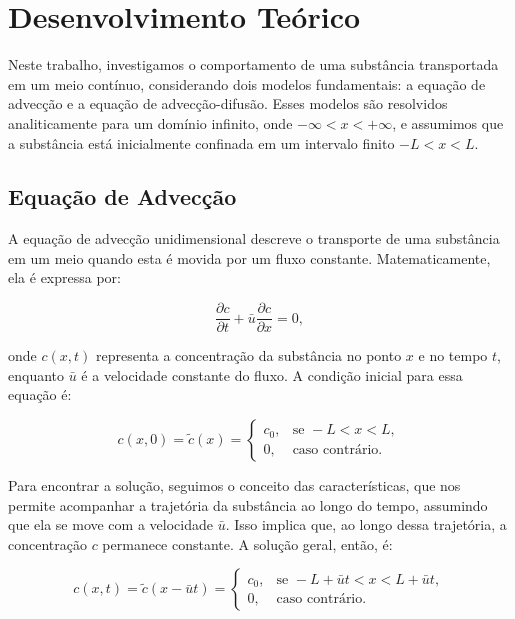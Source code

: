 \section{Desenvolvimento Teórico}

Neste trabalho, investigamos o comportamento de uma substância transportada em um meio contínuo, considerando dois modelos fundamentais: a equação de advecção e a equação de advecção-difusão. Esses modelos são resolvidos analiticamente para um domínio infinito, onde \( -\infty < x < +\infty \), e assumimos que a substância está inicialmente confinada em um intervalo finito \( -L < x < L \).

\subsection{Equação de Advecção}

A equação de advecção unidimensional descreve o transporte de uma substância em um meio quando esta é movida por um fluxo constante. Matematicamente, ela é expressa por:

\begin{equation}
    \frac{\partial c}{\partial t} + \bar{u} \frac{\partial c}{\partial x} = 0,
\end{equation}

onde \( c(x,t) \) representa a concentração da substância no ponto \( x \) e no tempo \( t \), enquanto \( \bar{u} \) é a velocidade constante do fluxo. A condição inicial para essa equação é:

\begin{equation}
    c(x, 0) = \tilde{c}(x) = \begin{cases}
    c_0, & \text{se } -L < x < L, \\
    0, & \text{caso contrário}.
    \end{cases}
\end{equation}

Para encontrar a solução, seguimos o conceito das características, que nos permite acompanhar a trajetória da substância ao longo do tempo, assumindo que ela se move com a velocidade \( \bar{u} \). Isso implica que, ao longo dessa trajetória, a concentração \( c \) permanece constante. A solução geral, então, é:

\begin{equation}
    c(x, t) = \tilde{c}(x - \bar{u}t) = \begin{cases}
    c_0, & \text{se } -L + \bar{u}t < x < L + \bar{u}t, \\
    0, & \text{caso contrário}.
    \end{cases}
\end{equation}

